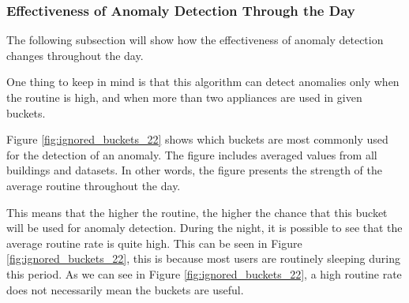 \subsubsection{Effectiveness of Anomaly Detection Through the Day}

The following subsection will show how the effectiveness of anomaly detection changes throughout the day.

One thing to keep in mind is that this algorithm can detect anomalies only when
the routine is high, and when more than two appliances are used in given buckets.

Figure \ref{fig:ignored_buckets_22} shows which buckets are most commonly used for the detection of an anomaly.
The figure includes averaged values from all buildings and datasets.
In other words, the figure presents the strength of the average routine throughout the day.

This means that the higher the routine, the higher the chance that this bucket will be used for anomaly detection.
During the night, it is possible to see that the average routine rate is quite high.
This can be seen in Figure \ref{fig:ignored_buckets_22},
this is because most users are routinely sleeping during this period.
As we can see in Figure \ref{fig:ignored_buckets_22},
a high routine rate does not necessarily mean the buckets are useful.


